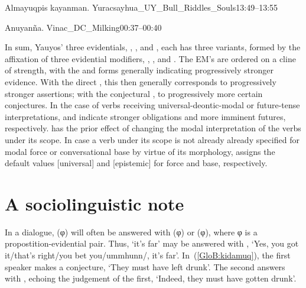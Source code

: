 %
{Almayuqpis kayanman.}%
{}%
{Yuracsayhua\_UY\_Bull\_Riddles\_Souls}{13:49--13:55}%

%
{Anuyanña.}%
{}%
{Vinac\_DC\_Milking}{00:37--00:40}%

In sum, Yauyos’ three evidentials, , , and , each has three variants, formed by the affixation of three evidential modifiers, \phono{-\uo}, , and . The EM’s are ordered on a cline of strength, with the  and  forms generally indicating progressively stronger evidence. With the direct , this then generally corresponds to progressively stronger assertions; with the conjectural , to progressively more certain conjectures. In the case of verbs receiving universal-deontic-modal or future-tense interpretations,  and  indicate stronger obligations and more imminent futures, respectively.  has the prior effect of changing the modal interpretation of the verbs under its scope. In case a verb under its scope is not already already specified for modal force or conversational base by virtue of its morphology,  assigns the default values [universal] and [epistemic] for force and base, respectively.

\section{A sociolinguistic note}
In a dialogue, \phono{-\uo}(φ) will often be answered with (φ) or (φ), where φ is a propostition-evidential pair. Thus,  ‘it’s far’ may be answered with ,  ‘Yes, you got it/that’s right/you bet you/ummhunn/, it’s far’. In~(\ref{GloB:kidamuq}), the first speaker makes a  conjecture, ‘They must have left drunk’. The second answers with , echoing the judgement of the first, ‘Indeed, they must have gotten drunk’.\\

